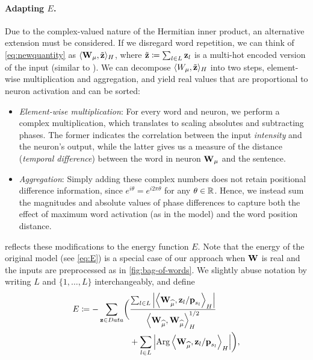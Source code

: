 \paragraph{Adapting $E$.}
Due to the complex-valued nature of the Hermitian inner product, an alternative extension must be considered.
If we disregard word repetition, we can think of \cref{eq:newquantity} as $\langle \boldsymbol{\mathbf{W}}_{\mu}, \tilde{\boldsymbol{\mathbf{z}}}\rangle_H$, where $\tilde{\boldsymbol{\mathbf{z}}} \coloneqq \sum_{l \in L}\boldsymbol{\mathbf{z}}_l$ is a multi-hot encoded version of the input (similar to \flyvec).
We can decompose $\langle W_{\mu}, \tilde{\boldsymbol{\mathbf{z}}}\rangle_H$ into two steps, element-wise multiplication and aggregation, and yield real values that are proportional to neuron activation and can be sorted:
\begin{itemize}
    \item \textit{Element-wise multiplication}: For every word and neuron, we perform a complex multiplication, which translates to scaling absolutes and subtracting phases. 
    The former indicates the correlation between the input \textit{intensity} and the neuron's output, while the latter gives us a measure of the distance (\textit{temporal difference}) between the word in neuron $\boldsymbol{\mathbf{W}}_\mu$ and the sentence.
    \item \textit{Aggregation}:
    Simply adding these complex numbers does not retain positional difference information, since $e^{i\theta} = e^{i2\pi\theta}$ for any $\theta\in\mathbb{R}$.
    Hence, we instead sum the magnitudes and absolute values of phase differences to capture both the effect of maximum word activation (as in the \flyvec model) and the word position distance.
\end{itemize}
 reflects these modifications to the energy function $E$.
Note that the energy of the original \flyvec model (see \cref{eq:E}) is a special case of our approach when $\boldsymbol{\mathbf{W}}$ is real and the inputs are preprocessed as in \cref{fig:bag-of-words}.
We slightly abuse notation by writing $L$ and $\{1,\dotsc,L\}$ interchangeably, and define
\begin{equation}
\begin{aligned}
E \coloneqq - \sum_{\vect{z} \in \inputs}\biggl(&\frac{ 
                               \sum_{l \in L}{
                                   \left\lvert \left\langle\vect{W}_{\widehat{\mu}}, \vect{z}_{l}/\vect{p}_{s_l}\right\rangle_H \right\rvert
                                   }
                             }
                             {  
                                \left\langle
                                \vect{W}_{\widehat{\mu}},\vect{W}_{\widehat{\mu}}
                                \right\rangle^{1/2}_H 
                             } \\
                            &+ 
                            \sum_{l \in L}{
                             \left\lvert \operatorname{Arg}\left\langle\vect{W}_{\widehat{\mu}}, \vect{z}_l/\vect{p}_{s_l} \right\rangle_H\right\rvert
                             } %
                        \biggr),
\label{eq:E-complex}
\end{aligned}
\end{equation}
